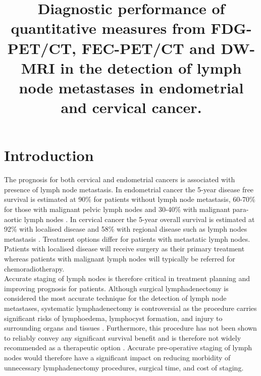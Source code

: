 \documentclass[sn-standardnature]{sn-jnl}
\theoremstyle{thmstyleone}%
\theoremstyle{thmstyletwo}%
\theoremstyle{thmstylethree}%
\begin{document}
    
\title[Article Title]{Diagnostic performance of quantitative measures from FDG-PET/CT, FEC-PET/CT and DW-MRI in the detection of lymph node metastases in endometrial and cervical cancer.}
\author[1]{ }


\maketitle

\section{Introduction}\label{sec1}

The prognosis for both cervical and endometrial cancers is associated with presence of lymph node metastasis. In endometrial cancer the 5-year disease free survival is estimated at 90\% for patients without lymph node metastasis, 60-70\% for those with malignant pelvic lymph nodes and 30-40\% with malignant para-aortic lymph nodes 
\cite{moriceEndometrialCancer2016}. 
In cervical cancer the 5-year overall survival is estimated at 92\% with localised disease and 58\% with regional disease such as lymph nodes metastasis 
\cite{siegelCancerStatistics20222022}. 
Treatment options differ for patients with metastatic lymph nodes. Patients with localised disease will receive surgery as their primary treatment whereas patients with malignant lymph nodes will typically be referred for chemoradiotherapy. \\

Accurate staging of lymph nodes is therefore critical in treatment planning and improving prognosis for patients. Although surgical lymphadenectomy is considered the most accurate technique for the detection of lymph node metastases, systematic lymphadenectomy is controversial as the procedure carries significant risks of lymphoedema, lymphocyst formation, and injury to surrounding organs and tissues 
\cite{querleuAuditPreoperativeEarly2006,achouriComplicationsLymphadenectomyGynecologic2013}. 
Furthermore, this procedure has not been shown to reliably convey any significant survival benefit and is therefore not widely recommended as a therapeutic option 
\cite{bollineniHighDiagnosticValue2016}. 
Accurate pre-operative staging of lymph nodes would therefore have a significant impact on reducing morbidity of unnecessary lymphadenectomy procedures, surgical time, and cost of staging. \\
\end{document}
